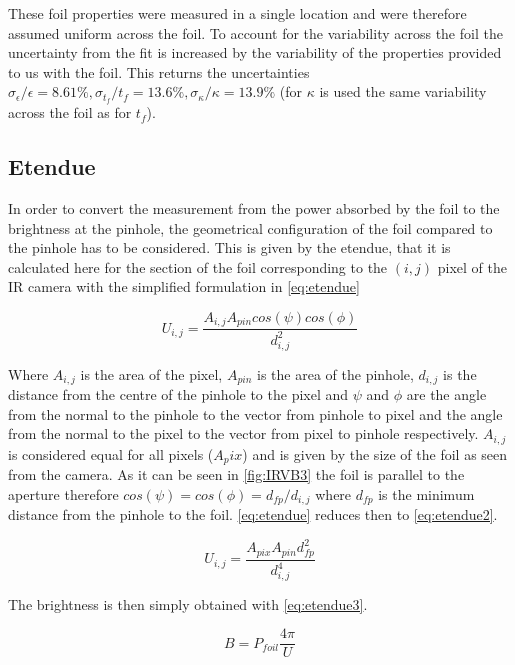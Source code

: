 These foil properties were measured in a single location and were therefore assumed uniform across the foil. To account for the variability across the foil the uncertainty from the fit is increased by the variability of the properties provided to us with the foil. This returns the uncertainties ${\sigma_{\epsilon}/\epsilon=8.61\%}, {\sigma_{t_f}/t_f=13.6\%}, {\sigma_{\kappa}/\kappa=13.9\%}$ (for $\kappa$ is used the same variability across the foil as for $t_f$).

\subsection{Etendue}\label{Etendue}
In order to convert the measurement from the power absorbed by the foil to the brightness at the pinhole, the geometrical configuration of the foil compared to the pinhole has to be considered. This is given by the etendue, that it is calculated here for the section of the foil corresponding to the $(i,j)$ pixel of the IR camera with the simplified formulation in \autoref{eq:etendue} \cite{Reinke2011,Carr2018a}

\begin{equation}
U_{i,j} = \frac{A_{i,j} A_{pin} cos(\psi) cos(\phi)}{d_{i,j}^2}
\label{eq:etendue}
\end{equation}

Where $A_{i,j}$ is the area of the pixel, $A_{pin}$ is the area of the pinhole, $d_{i,j}$ is the distance from the centre of the pinhole to the pixel and $\psi$ and $\phi$ are the angle from the normal to the pinhole to the vector from pinhole to pixel and the angle from the normal to the pixel to the vector from pixel to pinhole respectively. $A_{i,j}$ is considered equal for all pixels ($A_pix$) and is given by the size of the foil as seen from the camera. As it can be seen in \autoref{fig:IRVB3} the foil is parallel to the aperture therefore $cos(\psi) = cos(\phi) = d_{fp}/d_{i,j}$ where $d_{fp}$ is the minimum distance from the pinhole to the foil. \autoref{eq:etendue} reduces then to \autoref{eq:etendue2}.

\begin{equation}
U_{i,j} = \frac{A_{pix} A_{pin} d_{fp}^2}{d_{i,j}^4}
\label{eq:etendue2}
\end{equation}

The brightness is then simply obtained with \autoref{eq:etendue3}.

\begin{equation}
B = P_{foil}\frac{4\pi}{U}
\label{eq:etendue3}
\end{equation}



